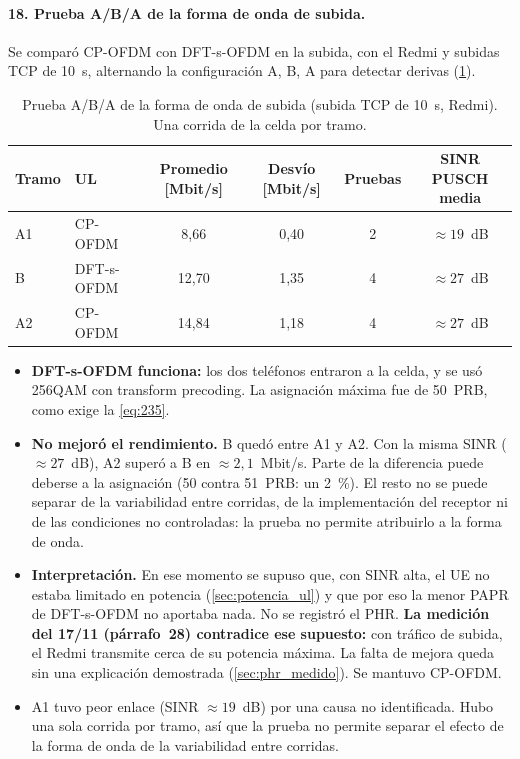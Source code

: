 \paragraph{18. Prueba A/B/A de la forma de onda de subida.} Se comparó CP-OFDM con DFT-s-OFDM en la subida, con el Redmi y subidas TCP de 10~s, alternando la configuración A, B, A para detectar derivas (\cref{tab:aba}).

\begin{table}[htbp]
\centering
\caption{Prueba A/B/A de la forma de onda de subida (subida TCP de 10~s, Redmi). Una corrida de la celda por tramo.}
\label{tab:aba}
\begin{tabular}{llcccc}
\toprule
Tramo & UL & Promedio [Mbit/s] & Desvío [Mbit/s] & Pruebas & SINR PUSCH media \\
\midrule
A1 & CP-OFDM & 8,66 & 0,40 & 2 & $\approx 19$~dB \\
B & DFT-s-OFDM & 12,70 & 1,35 & 4 & $\approx 27$~dB \\
A2 & CP-OFDM & 14,84 & 1,18 & 4 & $\approx 27$~dB \\
\bottomrule
\end{tabular}
\end{table}

\begin{itemize}
  \item \textbf{DFT-s-OFDM funciona:} los dos teléfonos entraron a la celda, y se usó 256QAM con transform precoding. La asignación máxima fue de 50~PRB, como exige la \cref{eq:235}.
  \item \textbf{No mejoró el rendimiento.} B quedó entre A1 y A2. Con la misma SINR ($\approx 27$~dB), A2 superó a B en $\approx 2{,}1$~Mbit/s. Parte de la diferencia puede deberse a la asignación (50 contra 51~PRB: un 2~\%). El resto no se puede separar de la variabilidad entre corridas, de la implementación del receptor ni de las condiciones no controladas: la prueba no permite atribuirlo a la forma de onda.
  \item \textbf{Interpretación.} En ese momento se supuso que, con SINR alta, el UE no estaba limitado en potencia (\cref{sec:potencia_ul}) y que por eso la menor PAPR de DFT-s-OFDM no aportaba nada. No se registró el PHR. \textbf{La medición del 17/11 (párrafo~28) contradice ese supuesto:} con tráfico de subida, el Redmi transmite cerca de su potencia máxima. La falta de mejora queda sin una explicación demostrada (\cref{sec:phr_medido}). Se mantuvo CP-OFDM.
  \item A1 tuvo peor enlace (SINR $\approx 19$~dB) por una causa no identificada. Hubo una sola corrida por tramo, así que la prueba no permite separar el efecto de la forma de onda de la variabilidad entre corridas.
\end{itemize}


